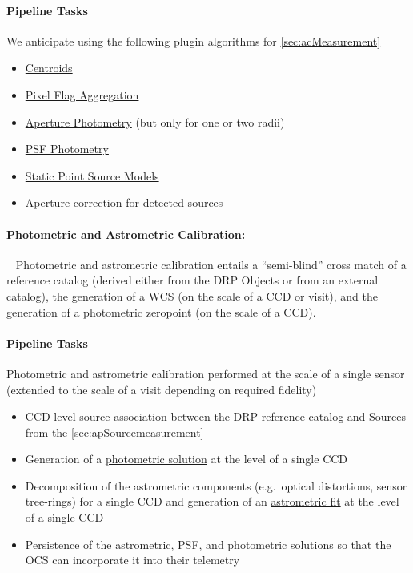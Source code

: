 \paragraph{Pipeline Tasks}
We anticipate using the following plugin algorithms for \ref{sec:acMeasurement}
\begin{itemize}
\item \hyperref[sec:acCentroidAlgorithms]{Centroids}
\item \hyperref[sec:acPixelFlags]{Pixel Flag Aggregation}
\item \hyperref[sec:acAperturePhotometry]{Aperture Photometry} (but only for one or two radii) 
\item \hyperref[sec:acPSFPhotometry]{PSF Photometry} 
\item \hyperref[sec:acStaticPointSourceModels]{Static Point Source Models}
\item  \hyperref[sec:apertureCorrection]{Aperture correction} for  detected sources
\end{itemize}

\paragraph{Photometric and Astrometric Calibration:}~
Photometric and astrometric calibration entails a ``semi-blind'' cross match of a reference catalog (derived either from the DRP Objects or from an external catalog), the generation of a WCS (on the scale of a CCD or visit), and the generation of a photometric zeropoint (on the scale of a CCD).

\paragraph{Pipeline Tasks}
Photometric and astrometric calibration performed at the scale of a
single sensor (extended to the scale of a visit depending on required fidelity)
\begin{itemize}
\item CCD level \hyperref[sec:acSingleCCDReferenceMatching]{source
    association} between the DRP reference catalog and Sources from the \ref{sec:apSourcemeasurement}
\item Generation of a \hyperref[sec:acSingleCCDPhotometricFit]{photometric solution} at the level of a single CCD
\item Decomposition of the astrometric components (e.g.\ optical distortions, sensor tree-rings) for a single CCD and generation of an \hyperref[sec:acSingleCCDAstrometricFit]{astrometric fit} at the level of a single CCD
\item Persistence of the astrometric, PSF, and photometric solutions so that the OCS can incorporate it into their telemetry
\end{itemize}

